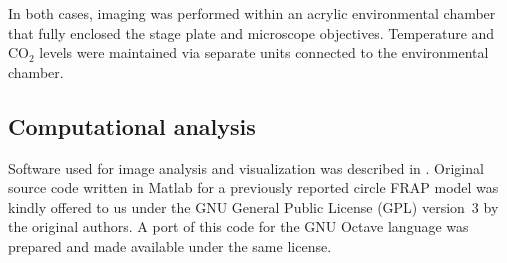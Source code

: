     In both cases, imaging was performed within an acrylic environmental
    chamber that fully enclosed the stage plate and microscope objectives.
    Temperature and CO$_2$ levels were maintained via separate units connected
    to the environmental chamber.

  \subsection{Computational analysis}

    Software used for image analysis and visualization was described in
    .
    Original source code written in Matlab for a previously
    reported circle FRAP model \citep{mcnally-frap-code} was kindly offered
    to us under the GNU General Public License (GPL) version~3 by the
    original authors. A port of this code for the GNU Octave language was
    prepared and made available under the same license.
